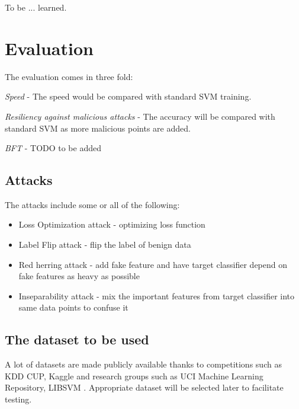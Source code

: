 \documentclass[10pt,conference,compsocconf,letterpaper]{IEEEtran}
\begin{document}
To be ... learned.

\section{Evaluation}

The evaluation comes in three fold:

\textit{Speed} - The speed would be compared with standard SVM training.

\textit{Resiliency against malicious attacks} - The accuracy will be compared with standard SVM as more malicious points are added.

\textit{BFT} - TODO to be added

\subsection{Attacks}

The attacks include some or all of the following:

\begin{itemize}
\item Loss Optimization attack - optimizing loss function \cite{biggio12}
\item Label Flip attack - flip the label of benign data \cite{xiao12}
\item Red herring attack - add fake feature and have target classifier depend on fake features as heavy as possible \cite{newsome06}
\item Inseparability attack - mix the important features from target classifier into same data points to confuse it \cite{newsome06}
\end{itemize}

\subsection{The dataset to be used}
A lot of datasets are made publicly available thanks to competitions such as KDD CUP, Kaggle and research groups such as UCI Machine Learning Repository, LIBSVM \cite{kddcup,kaggle,uci,libsvm}. Appropriate dataset will be selected later to facilitate testing.
\end{document}
